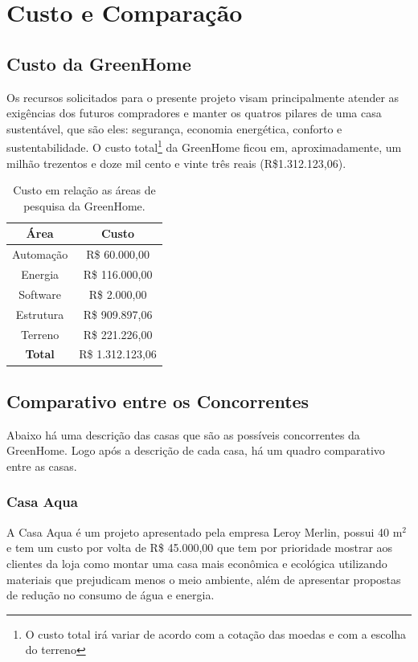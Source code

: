 \chapter[Comparativo]{Custo e Comparação}

\section{Custo da GreenHome}

Os recursos solicitados para o presente projeto visam principalmente atender as exigências dos futuros compradores e manter os quatros pilares de uma casa sustentável, que são eles: segurança, economia energética, conforto e sustentabilidade. O custo total\footnote{O custo total irá variar de acordo com a cotação das moedas e com a escolha do terreno} da GreenHome ficou em, aproximadamente, um milhão trezentos e doze mil cento e vinte três reais (R\$1.312.123,06).

\begin{table}[H]
\centering
\begin{tabular}{|c|c|}
\hline 
\textbf{Área} & \textbf{Custo}\tabularnewline
\hline 
\hline 
Automação & R\$ 60.000,00\tabularnewline
\hline 
Energia & R\$ 116.000,00\tabularnewline
\hline 
Software & R\$ 2.000,00\tabularnewline
\hline 
Estrutura & R\$ 909.897,06\tabularnewline
\hline 
Terreno & R\$ 221.226,00\tabularnewline
\hline 
\textbf{Total} & R\$ 1.312.123,06\tabularnewline
\hline 
\end{tabular}
\caption{Custo em relação as áreas de pesquisa da GreenHome.}
\end{table}


\section{Comparativo entre os Concorrentes}

Abaixo há uma descrição das casas que são as possíveis concorrentes da GreenHome. Logo após a descrição de cada casa, há um quadro comparativo entre as casas.

\subsection{Casa Aqua}

A Casa Aqua é um projeto apresentado pela empresa Leroy Merlin, possui 40 \si{\meter}$^2$ e tem um custo por volta de R\$ 45.000,00 que tem por prioridade mostrar aos clientes da loja como montar uma casa mais econômica e ecológica utilizando materiais que prejudicam menos o meio ambiente, além de apresentar propostas de redução no consumo de água e energia.

